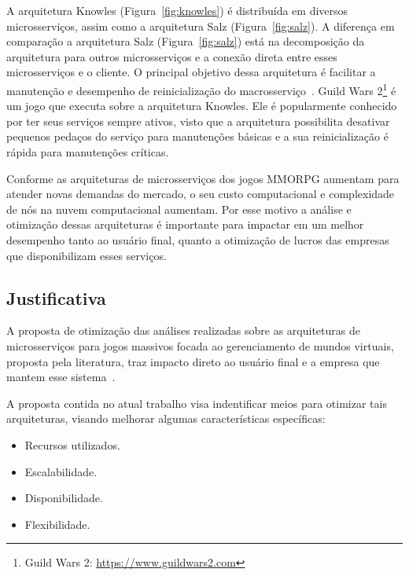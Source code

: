A arquitetura Knowles (Figura~\ref{fig:knowles}) é distribuída em diversos microsserviços, assim como a arquitetura Salz (Figura~\ref{fig:salz}).
%
A diferença em comparação a arquitetura Salz (Figura~\ref{fig:salz}) está na decomposição da arquitetura para outros microsserviços e a conexão direta entre esses microsserviços e o cliente.
%
O principal objetivo dessa arquitetura é facilitar a manutenção e desempenho de reinicialização do macrosserviço~\cite{stephenclarkewillson2017}.
%
Guild Wars 2\footnote[3]{Guild Wars 2: \url{https://www.guildwars2.com}} é um jogo que executa sobre a arquitetura Knowles.
%
Ele é popularmente conhecido por ter seus serviços sempre ativos, visto que a arquitetura possibilita desativar pequenos pedaços do serviço para manutenções básicas e a sua reinicialização é rápida para manutenções críticas.

Conforme as arquiteturas de microsserviços dos jogos \ac{MMORPG} aumentam para atender novas demandas do mercado, o seu custo computacional e complexidade de nós na nuvem computacional aumentam.
%
Por esse motivo a análise e otimização dessas arquiteturas é importante para impactar em um melhor desempenho tanto ao usuário final, quanto a otimização de lucros das empresas que disponibilizam esses serviços.

\subsection{Justificativa}

A proposta de otimização das análises realizadas sobre as arquiteturas de microsserviços para jogos massivos focada ao gerenciamento de mundos virtuais, proposta pela literatura, traz impacto direto ao usuário final e a empresa que mantem esse sistema~\cite{1417630}.

A proposta contida no atual trabalho visa indentificar meios para otimizar tais arquiteturas, visando melhorar algumas características específicas:

\begin{itemize}
  \item Recursos utilizados.
  \item Escalabilidade.
  \item Disponibilidade.
  \item Flexibilidade.
\end{itemize}
